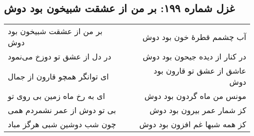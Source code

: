 \begin{center}
\section*{غزل شماره ۱۹۹: بر من از عشقت شبیخون بود دوش}
\label{sec:199}
\begin{longtable}{l p{0.5cm} r}
بر من از عشقت شبیخون بود دوش
&&
آب چشمم قطرهٔ خون بود دوش
\\
در دل از عشق تو دوزخ می‌نمود
&&
در کنار از دیده جیحون بود دوش
\\
ای توانگر همچو قارون از جمال
&&
عاشق از عشق تو قارون بود دوش
\\
ای به رخ ماه زمین بی روی تو
&&
مونس من ماه گردون بود دوش
\\
بی تو دوش از عمر نشمردم همی
&&
کز شمار عمر بیرون بود دوش
\\
چون شب دوشین شبی هرگز مباد
&&
کز همه شبها غم افزون بود دوش
\\
\end{longtable}
\end{center}
